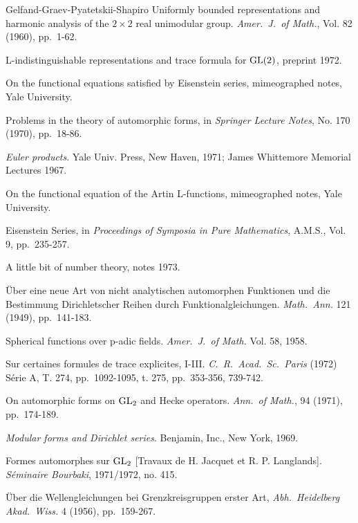\begin{thebibliography}{Gelfand-Graev-Pyatetskii-Shapiro}
 Uniformly bounded representations and harmonic analysis of the $2 \times 2$ real unimodular group. \emph{Amer.\ J.\ of Math.}, Vol. 82 (1960), pp.\ 1-62.

 L-indistinguishable representations and trace formula for $\operatorname{GL}(2)$, preprint 1972.

 On the functional equations satisfied by Eisenstein series, mimeographed notes, Yale University.

 Problems in the theory of automorphic forms, in \emph{Springer Lecture Notes}, No. 170 (1970), pp.\ 18-86.

 \emph{Euler products}. Yale Univ. Press, New Haven, 1971; James Whittemore Memorial Lectures 1967.

 On the functional equation of the Artin L-functions, mimeographed notes, Yale University.

 Eisenstein Series, in \emph{Proceedings of Symposia in Pure Mathematics}, A.M.S., Vol. 9, pp.\ 235-257.

 A little bit of number theory, notes 1973.

 \"Uber eine neue Art von nicht analytischen automorphen Funktionen und die Bestimmung Dirichletscher Reihen durch Funktionalgleichungen. \emph{Math.\ Ann.} 121 (1949), pp.\ 141-183.

 Spherical functions over p-adic fields. \emph{Amer.\ J.\ of Math.} Vol. 58, 1958.

 Sur certaines formules de trace explicites, I-III. \emph{C.\ R.\ Acad.\ Sc.\ Paris} (1972) S\'erie A, T. 274, pp.\ 1092-1095, t. 275, pp.\ 353-356, 739-742.

 On automorphic forms on $\operatorname{GL}_2$ and Hecke operators. \emph{Ann.\ of Math.}, 94 (1971), pp.\ 174-189.

 \emph{Modular forms and Dirichlet series}. Benjamin, Inc., New York, 1969.

 Formes automorphes sur $\operatorname{GL}_2$ [Travaux de H. Jacquet et R. P. Langlands]. \emph{S\'eminaire Bourbaki}, 1971/1972, no. 415.

 \"Uber die Wellengleichungen bei Grenzkreisgruppen erster Art, \emph{Abh.\ Heidelberg Akad.\ Wiss.} 4 (1956), pp.\ 159-267.


\end{thebibliography}
